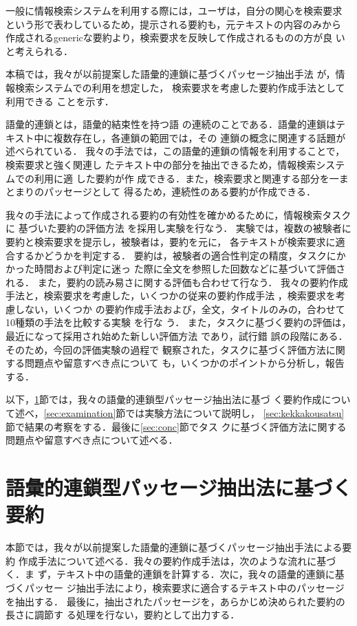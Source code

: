 一般に情報検索システムを利用する際には，ユーザは，自分の関心を検索要求
という形で表わしているため，提示される要約も，元テキストの内容のみから
作成されるgenericな要約より，検索要求を反映して作成されるものの方が良
いと考えられる．


本稿では，我々が以前提案した語彙的連鎖に基づくパッセージ抽出手法
\cite{Mochizuki:99:a}が，情報検索システムでの利用を想定した，
検索要求を考慮した要約作成手法として
利用できる
ことを示す．

語彙的連鎖\cite{Morris:91}とは，語彙的結束性\cite{Halliday:76}を持つ語
の連続のことである．語彙的連鎖はテキスト中に複数存在し，各連鎖の範囲では，その
連鎖の概念に関連する話題が述べられている\cite{okumura:94a,Barzilay:97}．
我々の手法では，この語彙的連鎖の情報を利用することで，検索要求と強く関連し
たテキスト中の部分を抽出できるため，情報検索システムでの利用に適
した要約が作
成できる．また，検索要求と関連する部分を一まとまりのパッセージとして
得るため，連続性のある要約が作成できる．

我々の手法によって作成される要約の有効性を確かめるために，情報検索タスクに
基づいた要約の評価方法
\cite{Miike:94,Hand:97,Jing:98,Mani:98:a,tombros:98:b,Oku:99:a}
を採用し実験を行なう．
実験では，複数の被験者に要約と検索要求を提示し，被験者は，要約を元に，
各テキストが検索要求に適合するかどうかを判定する．
要約は，被験者の適合性判定の精度，タスクにかかった時間および判定に迷っ
た際に全文を参照した回数などに基づいて評価される．
また，要約の読み易さに関する評価も合わせて行なう．
我々の要約作成手法と，検索要求を考慮した，いくつかの従来の要約作成手法
\cite{tombros:98:b,shiomi:98:a,hasui:98:a}，検索要求を考慮しない，いくつか
の要約作成手法および，全文，タイトルのみの，合わせて10種類の手法を比較する実験
を行な
う．
また，タスクに基づく要約の評価は，最近になって採用され始めた新しい評価方法
であり，試行錯
誤の段階にある．そのため，今回の評価実験の過程で
観察された，タスクに基づく評価方法に関する問題点や留意すべき点について
も，いくつかのポイントから分析し，報告する．

以下，\ref{sec:sumpas}節では，我々の語彙的連鎖型パッセージ抽出法に基づ
く要約作成について述べ，\ref{sec:examination}節では実験方法について説明し，
\ref{sec:kekkakousatsu}節で結果の考察をする．最後に\ref{sec:conc}節でタス
クに基づく評価方法に関する問題点や留意すべき点について述べる．

\section{語彙的連鎖型パッセージ抽出法に基づく要約}\label{sec:sumpas}
本節では，我々が以前提案した語彙的連鎖に基づくパッセージ抽出手法による要約
作成手法について述べる．我々の要約作成手法は，次のような流れに基づく．ま
ず，テキスト中の語彙的連鎖を計算する．次に，我々の語彙的連鎖に基づくパッセー
ジ抽出手法により，検索要求に適合するテキスト中のパッセージを抽出する．
最後に，抽出されたパッセージを，あらかじめ決められた要約の長さに調節す
る処理を行ない，要約として出力する．

